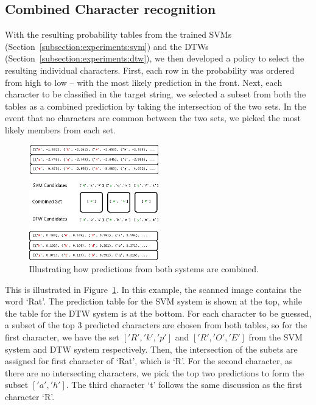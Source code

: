 \documentclass[12pt]{article}
\begin{document}
	\subsection{Combined Character recognition}
	\label{subsection:experiments:combinedchar}
		
	With the resulting probability tables from the trained SVMs (Section~\ref{subsection:experiments:svm}) and the DTWs (Section~\ref{subsection:experiments:dtw}), we then developed a policy to select the resulting individual characters. First, each row in the probability was ordered from high to low -- with the most likely prediction in the front. Next, each character to be classified in the target string, we selected a subset from both the tables as a combined prediction by taking the intersection of the two sets. In the event that no characters are common between the two sets, we picked the most likely members from each set. 
	
	\begin{figure}[htbp!]
	\centering
	\includegraphics[width=0.5\textwidth]{combined_predictions.eps}
	\caption{Illustrating how predictions from both systems are combined.}
	\label{figure:combining_characters}
	\end{figure}
	
	
	This is illustrated in Figure~\ref{figure:combining_characters}. In this example, the scanned image contains the word `Rat'. The prediction table for the SVM system is shown at the top, while the table for the DTW system is at the bottom. For each character to be guessed, a subset of the top 3 predicted characters are chosen from both tables, so for the first character, we have the set $['R', 'k', 'p']$ and $['R', 'O', 'E']$ from the SVM system and DTW system respectively. Then, the intersection of the subets are assigned for first character of `Rat', which is `R'. For the second character, as there are no intersecting characters, we pick the top two predictions to form the subset $['a', 'h']$. The third character `t' follows the same discussion as the first character `R'.
	
\end{document}
